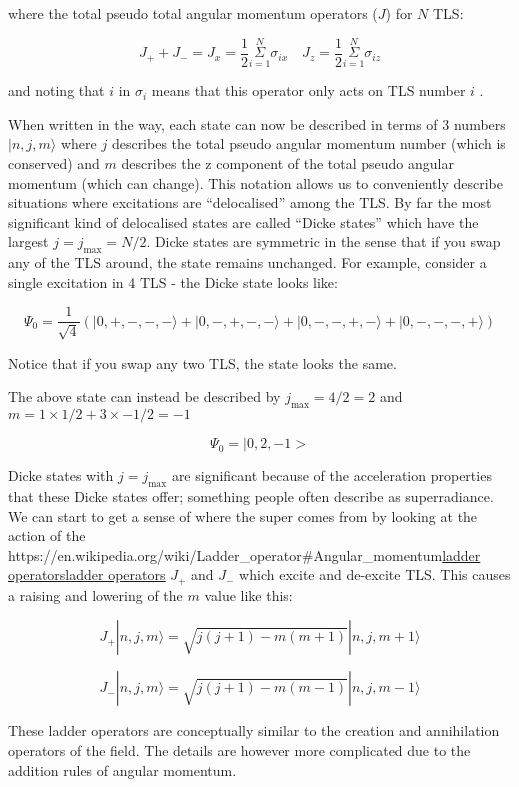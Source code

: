 \documentclass[
]{article}
\let\oldhref\href
\renewcommand{\href}[2]{\ifx#1\urlprefix\oldhref{#1}{#2}\else\uline{\oldhref{#1}{#2}}\fi}
\renewcommand{\[}{\begin{equation}}
\renewcommand{\]}{\end{equation}}
\begin{document}
where the total pseudo total angular momentum operators (\(J\)) for
\(N\) TLS:

\[
J_{+} + J_{-} = J_{x} = \frac{1}{2}\overset{N}{\underset{i=1}{\Sigma}} \sigma_{i x} \,\,\,\,\,\, J_{z} = \frac{1}{2}\overset{N}{\underset{i=1}{\Sigma}} \sigma_{i z}
\]

and noting that \(i\) in \(\sigma_i\) means that this operator only acts
on TLS number \(i\) .

When written in the way, each state can now be described in terms of 3
numbers \(|n, j, m\rangle\) where \(j\) describes the total pseudo
angular momentum number (which is conserved) and \(m\) describes the z
component of the total pseudo angular momentum (which can change). This
notation allows us to conveniently describe situations where excitations
are ``delocalised'' among the TLS. By far the most significant kind of
delocalised states are called ``Dicke states'' which have the largest
\(j=j_{\max} = N/2\). Dicke states are symmetric in the sense that if
you swap any of the TLS around, the state remains unchanged. For
example, consider a single excitation in 4 TLS - the Dicke state looks
like:

\[
\Psi_0 = \frac{1}{\sqrt{4}}\left(| 0, +, -, -, - \rangle + | 0, -, +, -, - \rangle + | 0, -, -, +, - \rangle + | 0, -, -, -, + \rangle \right)
\]

Notice that if you swap any two TLS, the state looks the same.

The above state can instead be described by \(j_{\max}= 4/2  = 2\) and
\(m = 1\times 1/2 + 3\times -1/2 =-1\)

\[
\Psi_0 = |0,2,-1>
\]

Dicke states with \(j=j_{\max}\) are significant because of the
acceleration properties that these Dicke states offer; something people
often describe as superradiance. We can start to get a sense of where
the super comes from by looking at the action of the
\href{https://en.wikipedia.org/wiki/Ladder_operator\#Angular_momentum}{ladder
operators} \(J_{+}\) and \(J_{-}\) which excite and de-excite TLS. This
causes a raising and lowering of the \(m\) value like this:

\[
J_+ |n, j, m\rangle  =  \sqrt{j(j + 1) - m(m + 1)} |n, j, m + 1\rangle
\]

\[
J_- |n, j, m\rangle =  \sqrt{j(j + 1) - m(m - 1)} |n, j, m - 1\rangle
\]

These ladder operators are conceptually similar to the creation and
annihilation operators of the field. The details are however more
complicated due to the addition rules of angular momentum.
\end{document}
